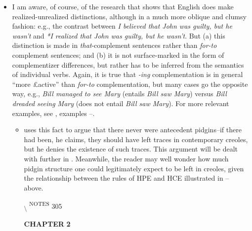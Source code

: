 \begin{itemize}
\begin{itemize}
\begin{itemize}
\item I am aware, of course, of the research that shows that English does make realized-unrealized distinctions, although in a much more oblique and clumsy fashion: e.g., the contrast between \textit{I believed that John was guilty, but he wasn't} and \textit{*I realized that John was guilty,  but he wasn't}. But (a) this distinction is made in \textit{that}-complement sentences rather than \textit{for-to} complement sentences; and (b) it is not surface-marked in the form of complementizer differences, but rather has to be inferred from the semantics of individual verbs. Again, it is true that \textit{-ing} complementation is in general ``more £active'' than \textit{for-to} complementation, but many cases go the opposite way, e.g., \textit{Bill managed to see Mary} (entails \textit{Bill saw Mary}) versus \textit{Bill dreaded seeing Mary} (does not entail \textit{Bill saw Mary}). For more relevant exam\-ples, see , examples --.

\begin{itemize}
\item \citet{Alleyne1979} uses this fact to argue that there never were antecedent pidgins--if there had been, he claims, they should have left traces in contemporary creoles, but he denies the existence of such traces. This argument will be dealt with further in . Meanwhile, the reader may well wonder how much pidgin structure one could legitimately expect to be left in creoles, given the relation\-ship between the rules of HPE and HCE illustrated in -- above.

\textsubscript{{\textbackslash} }\textsuperscript{NOTES} 305

\textbf{CHAPTER} \textbf{2}


\end{itemize}
\end{itemize}
\end{itemize}
\end{itemize}
